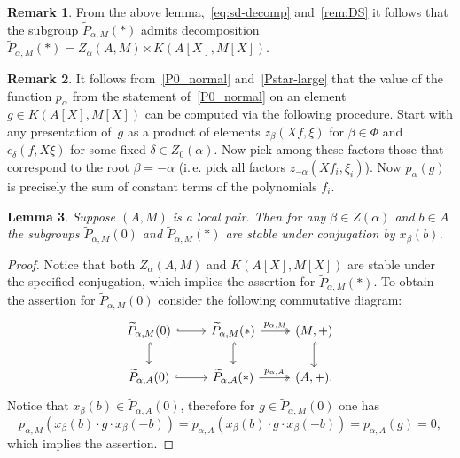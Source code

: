 \documentclass[10pt,a4paper,twoside]{article}
\newtheorem{lemma}{Lemma}
\theoremstyle{remark}
\theoremstyle{definition}
\numberwithin{lemma}{section}
\numberwithin{prop}{section}
\numberwithin{corollary}{section}
\numberwithin{externaltheorem}{section}
\newtheorem{rem}[lemma]{Remark}
\numberwithin{equation}{section}
\begin{document}
\begin{rem} \label{Pstar-char} From the above lemma,~\eqref{eq:sd-decomp} and~\cref{rem:DS} it follows that the subgroup $\widetilde{P}_{\alpha, M}(*)$ admits decomposition $\widetilde{P}_{\alpha, M}(*) = Z_\alpha(A, M) \ltimes K(A[X], M[X]).$ \end{rem} 

\begin{rem} \label{rem:palpha} It follows from~\cref{P0_normal} and~\cref{Pstar-large} that the value of the function $p_\alpha$ from the statement of~\cref{P0_normal} on an element $g\in K(A[X], M[X])$ can be computed via the following procedure. 
Start with any presentation of~$g$ as a product of elements $z_{\beta}(Xf, \xi)$ for $\beta \in \Phi$ and $c_\delta(f, X\xi)$ for some fixed $\delta\in Z_0(\alpha)$. 
Now pick among these factors those that correspond to the root $\beta = -\alpha$ (i.\,e. pick all factors $z_{-\alpha}(Xf_i, \xi_i)$). 
Now $p_\alpha(g)$ is precisely the sum of constant terms of the polynomials $f_i$. \end{rem}

\begin{lemma} \label{P0-conj-invariant} Suppose $(A, M)$ is a local pair. Then for any $\beta \in Z(\alpha)$ and $b \in A$ the subgroups $\widetilde{P}_{\alpha, M}(0)$ and $\widetilde{P}_{\alpha, M}(*)$ are stable under conjugation by $x_\beta(b)$. \end{lemma}
\begin{proof}
Notice that both $Z_\alpha(A, M)$ and $K(A[X], M[X])$ are stable under the specified conjugation, which implies the assertion for $\widetilde{P}_{\alpha, M}(*)$. 
To obtain the assertion for $\widetilde{P}_{\alpha, M}(0)$ consider the following commutative diagram:
\[\begin{tikzcd} \widetilde{P}_{\alpha, M}(0) \arrow[r, hookrightarrow] \arrow[d, hookrightarrow] & \widetilde{P}_{\alpha, M}(*) \arrow[r, "p_{\alpha, M}", twoheadrightarrow] \ar[d, hookrightarrow] & (M, +) \ar[d, hookrightarrow] \\ \widetilde{P}_{\alpha, A}(0) \ar[r, hookrightarrow] & \widetilde{P}_{\alpha, A}(*) \ar[r, "p_{\alpha, A}", twoheadrightarrow] & (A, +). \end{tikzcd} \]
Notice that $x_\beta(b) \in \widetilde{P}_{\alpha, A}(0)$, therefore for $g \in \widetilde{P}_{\alpha, M}(0)$ one has \[p_{\alpha, M}(x_\beta(b) \cdot g \cdot x_\beta(-b)) = p_{\alpha, A}(x_\beta(b) \cdot g \cdot x_\beta(-b)) = p_{\alpha, A}(g) = 0,\] which implies the assertion.\end{proof}
\end{document}
